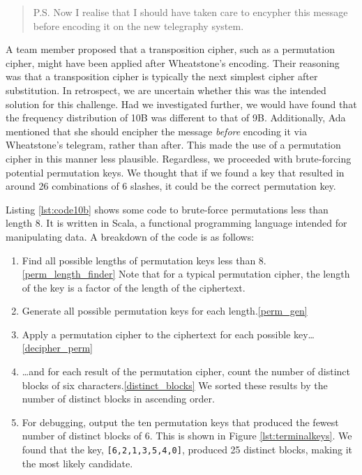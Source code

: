 \begin{quote}\ttfamily
    P.S. Now I realise that I should have taken care to encypher this message before 
    encoding it on the new telegraphy system.
\end{quote}

A team member proposed that a transposition cipher, such as a permutation cipher, might have been applied after Wheatstone's encoding. Their reasoning was that a transposition cipher is typically the next simplest cipher after substitution. In retrospect, we are uncertain whether this was the intended solution for this challenge. Had we investigated further, we would have found that the frequency distribution of 10B was different to that of 9B. Additionally, Ada mentioned that she should encipher the message \textit{before} encoding it via Wheatstone's telegram, rather than after. This made the use of a permutation cipher in this manner less plausible. Regardless, we proceeded with brute-forcing potential permutation keys. We thought that if we found a key that resulted in around 26 combinations of 6 slashes, it could be the correct permutation key.

Listing \ref{lst:code10b} shows some code to brute-force permutations less than length 8. It is written in Scala, a functional programming language intended for manipulating data. A breakdown of the code is as follows:

\begin{enumerate}
    \item Find all possible lengths of permutation keys less than 8.\cref{perm_length_finder} Note that for a typical permutation cipher, the length of the key is a factor of the length of the ciphertext.
    \item Generate all possible permutation keys for each length.\cref{perm_gen}
    \item Apply a permutation cipher to the ciphertext for each possible key\ldots\cref{decipher_perm}
    \item \ldots and for each result of the permutation cipher, count the number of distinct blocks of six characters.\cref{distinct_blocks} We sorted these results by the number of distinct blocks in ascending order.
    \item For debugging, output the ten permutation keys that produced the fewest number of distinct blocks of 6. This is shown in Figure \ref{lst:terminalkeys}. We found that the key, \texttt{[6,2,1,3,5,4,0]}, produced 25 distinct blocks, making it the most likely candidate.
\end{enumerate}

